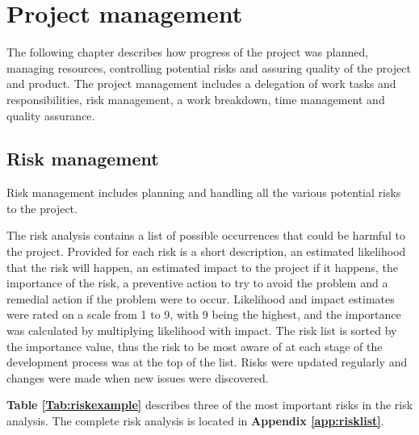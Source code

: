 
\chapter{Project management}

The following chapter describes how progress of the project was planned, managing resources, controlling potential risks and assuring quality of the project and product. The project management includes a delegation of work tasks and responsibilities, risk management, a work breakdown, time management and quality assurance.

\section{Risk management}
\label{sec:risk_management}

Risk management includes planning and handling all the various potential risks to the project.

The risk analysis contains a list of possible occurrences that could be harmful to the project. Provided for each risk is a short description, an estimated likelihood that the risk will happen, an estimated impact to the project if it happens, the importance of the risk, a preventive action to try to avoid the problem and a remedial action if the problem were to occur. Likelihood and impact estimates were rated on a scale from 1 to 9, with 9 being the highest, and the importance was calculated by multiplying likelihood with impact. The risk list is sorted by the importance value, thus the risk to be most aware of at each stage of the development process was at the top of the list. Risks were updated regularly and changes were made when new issues were discovered.\newline

\textbf{Table \ref{Tab:riskexample}} describes three of the most important risks in the risk analysis. The complete risk analysis is located in \textbf{Appendix \ref{app:risklist}}.


